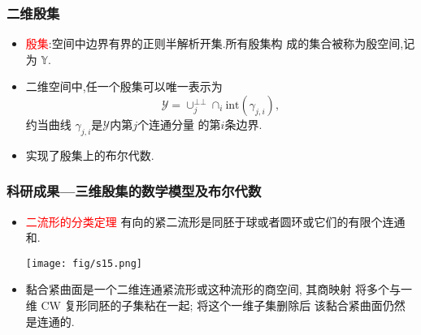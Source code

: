 \documentclass[UTF8]{ctexbeamer}	%
\theoremstyle{plain}
\theoremstyle{definition}
\theoremstyle{remark}
\numberwithin{equation}{section}
\begin{document}
\begin{frame}
    \frametitle{二维殷集}
    \begin{itemize}
        \item \textcolor{red}{殷集}:空间中边界有界的正则半解析开集.所有殷集构
              成的集合被称为殷空间,记为 $\mathbb{Y}$.
        \item 二维空间中,任一个殷集可以唯一表示为
              \[\mathcal{Y} = \cup_j^{\bot \bot}\cap_i \text{int}(\gamma_{j, i} ),\]
              约当曲线 $\gamma_{j, i}$是$\mathcal{Y}$内第$j$个连通分量
              的第$i$条边界.
        \item 实现了殷集上的布尔代数.
    \end{itemize}
    \begin{figure}[htb]
        \centering
    \end{figure}
\end{frame}

\begin{frame}
    \frametitle{科研成果---三维殷集的数学模型及布尔代数}
    \begin{itemize}
        \item
              \textcolor{red}{二流形的分类定理} \newline
              有向的紧二流形是同胚于球或者圆环或它们的有限个连通和.
              \begin{center}
                  \texttt{[image: fig/s15.png]}
              \end{center}


        \item 黏合紧曲面是一个二维连通紧流形或这种流形的商空间, 其商映射
              将多个与一维 CW 复形同胚的子集粘在一起; 将这个一维子集删除后
              该黏合紧曲面仍然是连通的.
    \end{itemize}
\end{frame}
\end{document}
